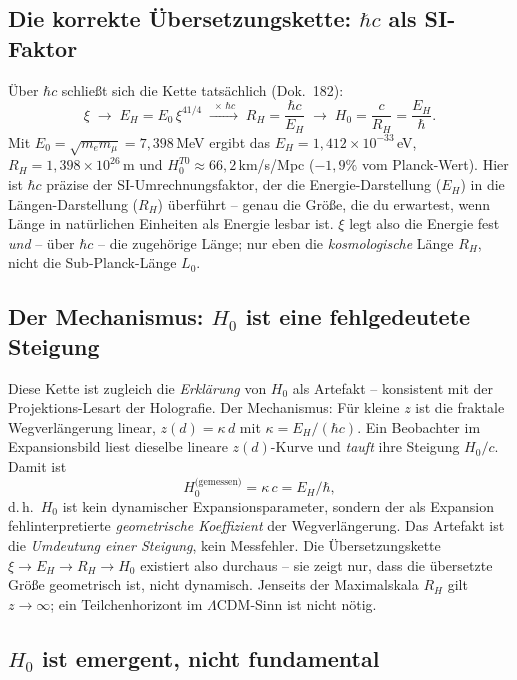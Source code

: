 \subsection*{Die korrekte Übersetzungskette: $\hbar c$ als SI-Faktor}

Über $\hbar c$ schließt sich die Kette tatsächlich (Dok.~182):
\[
  \xi \;\longrightarrow\; E_H = E_0\,\xi^{41/4}
  \;\xrightarrow{\;\times\,\hbar c\;}\; R_H = \frac{\hbar c}{E_H}
  \;\longrightarrow\; H_0 = \frac{c}{R_H} = \frac{E_H}{\hbar}.
\]
Mit $E_0 = \sqrt{m_e m_\mu} = 7{,}398$\,MeV ergibt das $E_H = 1{,}412\times
10^{-33}$\,eV, $R_H = 1{,}398\times10^{26}$\,m und $H_0^{T0} \approx
66{,}2$\,km/s/Mpc ($-1{,}9\%$ vom Planck-Wert). Hier ist $\hbar c$ präzise der
SI-Umrechnungsfaktor, der die Energie-Darstellung ($E_H$) in die
Längen-Darstellung ($R_H$) überführt -- genau die Größe, die du erwartest,
wenn Länge in natürlichen Einheiten als Energie lesbar ist. $\xi$ legt also
die Energie fest \emph{und} -- über $\hbar c$ -- die zugehörige Länge; nur
eben die \emph{kosmologische} Länge $R_H$, nicht die Sub-Planck-Länge $L_0$.

\subsection*{Der Mechanismus: $H_0$ ist eine fehlgedeutete Steigung}

Diese Kette ist zugleich die \emph{Erklärung} von $H_0$ als Artefakt --
konsistent mit der Projektions-Lesart der Holografie. Der
Mechanismus: Für kleine $z$ ist die fraktale Wegverlängerung linear,
$z(d) = \kappa\,d$ mit $\kappa = E_H/(\hbar c)$. Ein Beobachter im
Expansionsbild liest dieselbe lineare $z(d)$-Kurve und \emph{tauft} ihre
Steigung $H_0/c$. Damit ist
\[
  H_0^{\text{(gemessen)}} = \kappa\,c = E_H/\hbar,
\]
d.\,h.\ $H_0$ ist kein dynamischer Expansionsparameter, sondern der als
Expansion fehlinterpretierte \emph{geometrische Koeffizient} der
Wegverlängerung. Das Artefakt ist die \emph{Umdeutung einer Steigung}, kein
Messfehler. Die Übersetzungskette $\xi \to E_H \to R_H \to H_0$ existiert also
durchaus -- sie zeigt nur, dass die übersetzte Größe geometrisch ist, nicht
dynamisch. Jenseits der Maximalskala $R_H$ gilt $z\to\infty$; ein
Teilchenhorizont im $\Lambda$CDM-Sinn ist nicht nötig.

\subsection*{$H_0$ ist emergent, nicht fundamental}

